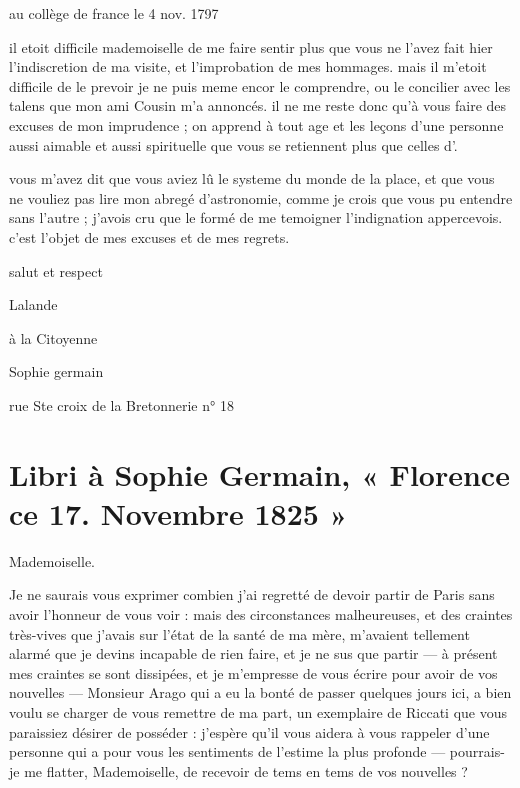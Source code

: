 \documentclass[11pt,a4paper]{article}
\begin{document}
au collège de france le 4 nov. 1797

il etoit difficile mademoiselle de me faire sentir plus que vous ne l'avez
fait hier l'indiscretion de ma visite, et l'improbation de mes hommages. mais
il m'etoit difficile de le prevoir je ne puis meme encor le comprendre, ou le
concilier avec les talens que mon ami Cousin m'a annoncés. il ne me reste
donc qu'à vous faire des excuses de mon imprudence ; on apprend à tout age et
les leçons d'une personne aussi aimable et aussi spirituelle que vous se
retiennent plus que celles d'.

vous m'avez dit que vous aviez lû le systeme du monde de la place, et que
vous ne vouliez pas lire mon abregé d'astronomie, comme je crois que
\struck{\ill{}} vous  pu entendre \ill{} sans l'autre ;
j'avois cru \struck{\ill{}} \ill{} que le  \ill{} formé de
me temoigner l'indignation \ill{} appercevois. c'est l'objet de mes excuses
et de mes regrets.

salut et respect

Lalande


à la Citoyenne

Sophie germain

rue Ste croix de la Bretonnerie n° 18


\section{Libri à Sophie Germain, « Florence ce 17. Novembre 1825 »}

Mademoiselle.

Je ne saurais vous exprimer combien j'ai regretté de devoir partir de Paris
sans avoir l'honneur de vous voir : mais des circonstances malheureuses, et
des craintes très-vives que j'avais sur l'état de la santé de ma mère,
m'avaient tellement alarmé que je devins incapable de rien faire, et je ne
sus que partir — à présent mes craintes se sont dissipées, et je m'empresse
de vous écrire pour avoir de vos nouvelles — Monsieur Arago qui a eu la bonté
de passer quelques jours ici, a bien voulu se charger de vous remettre de ma
part, un exemplaire de Riccati que vous paraissiez désirer de posséder :
j'espère qu'il vous aidera à vous rappeler d'une personne qui a pour vous les
sentiments de l'estime la plus profonde — pourrais-je me flatter,
Mademoiselle, de recevoir de tems en tems de vos nouvelles ?
\end{document}
